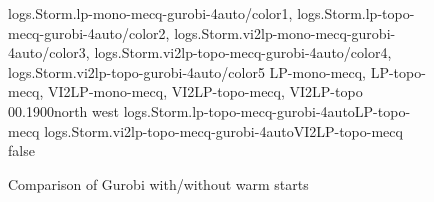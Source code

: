 
\begin{figure*}[t]
	\centering
	{
logs.Storm.lp-mono-mecq-gurobi-4auto/color1,
logs.Storm.lp-topo-mecq-gurobi-4auto/color2,
logs.Storm.vi2lp-mono-mecq-gurobi-4auto/color3,
logs.Storm.vi2lp-topo-mecq-gurobi-4auto/color4,
logs.Storm.vi2lp-topo-gurobi-4auto/color5
}
	{LP-mono-mecq, LP-topo-mecq, VI2LP-mono-mecq, VI2LP-topo-mecq, VI2LP-topo}
	{0}{\numcommunity}{0.1}{900}{north west}
%
{logs.Storm.lp-topo-mecq-gurobi-4auto}{LP-topo-mecq}
{logs.Storm.vi2lp-topo-mecq-gurobi-4auto}{VI2LP-topo-mecq}
{false}
\caption{Comparison of Gurobi with/without warm starts}
\label{fig:LP-warmstarts}
\end{figure*}